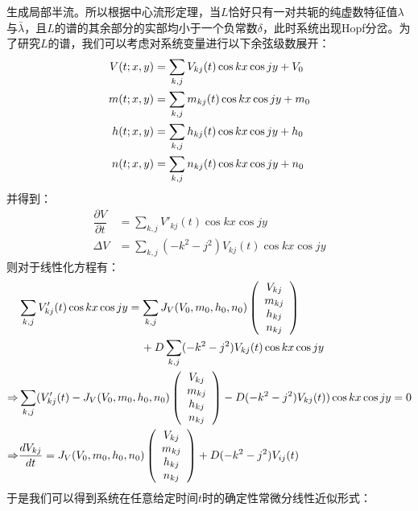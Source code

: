 \documentclass[
pdflinks,
]{xjtuthesis}
\begin{document}
生成局部半流。所以根据中心流形定理，当$L$恰好只有一对共轭的纯虚数特征值$\lambda$与$\bar{\lambda}$，且$L$的谱的其余部分的实部均小于一个负常数$\delta$，此时系统出现Hopf分岔。为了研究$L$的谱，我们可以考虑对系统变量进行以下余弦级数展开：
\begin{align}
\notag V(t;x,y)& =\sum_{k,j} V_{kj}(t)\cos kx \cos jy + V_0\\
m(t;x,y)& =\sum_{k,j} m_{kj}(t)\cos kx \cos jy +m_0\\
\notag h(t;x,y)& =\sum_{k,j} h_{kj}(t)\cos kx \cos jy +h_0\\
\notag n(t;x,y)& =\sum_{k,j} n_{kj}(t)\cos kx \cos jy +n_0
\end{align}
并得到：
\begin{align}
\dfrac{\partial V}{\partial t} &= \sum_{k,j} V'_{kj}(t)\cos kx \cos jy \\
\Delta V &= \sum_{k,j} (-k^2-j^2) V_{kj}(t)\cos kx \cos jy 
\end{align}
则对于线性化方程有：
\begin{align}
\notag &\sum_{k,j} V'_{kj}(t)\cos kx \cos jy = \sum_{k,j} J_{V}(V_0,m_0,h_0,n_0)
\left(
\begin{array}{c}
V_{kj}\\
m_{kj}\\
h_{kj}\\
n_{kj}
\end{array}
\right)\\
& \quad \quad \quad \quad \quad \quad \quad \quad \quad \quad \quad +D\sum_{k,j} (-k^2-j^2) V_{kj}(t)\cos kx \cos jy\\
\notag \Rightarrow & \sum_{k,j} (V'_{kj}(t)-J_{V}(V_0,m_0,h_0,n_0)
\left(
\begin{array}{c}
V_{kj}\\
m_{kj}\\
h_{kj}\\
n_{kj}
\end{array}
\right) -D(-k^2-j^2) V_{kj}(t))\cos kx \cos jy=0 \\
\Rightarrow & \dfrac{d V_{kj}}{d t}= J_{V}(V_0,m_0,h_0,n_0)
\left(
\begin{array}{c}
V_{kj}\\
m_{kj}\\
h_{kj}\\
n_{kj}
\end{array}
\right)+D(-k^2-j^2)V_{ij}(t)
\end{align}
于是我们可以得到系统在任意给定时间$t$时的确定性常微分线性近似形式：
\end{document}
